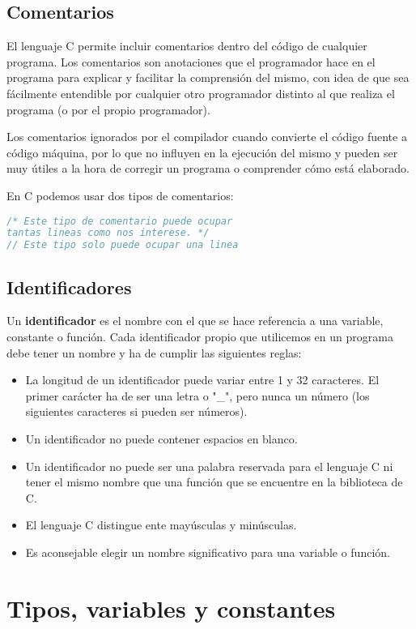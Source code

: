 \subsection{Comentarios}{
El lenguaje C permite incluir comentarios dentro del código de cualquier programa. Los comentarios son anotaciones que el programador hace en el programa para explicar y facilitar la comprensión del mismo, con idea de que sea fácilmente entendible por cualquier otro programador distinto al que realiza el programa (o por el propio programador).

Los comentarios ignorados por el compilador cuando convierte el código fuente a código máquina, por lo que no influyen en la ejecución del mismo y pueden ser muy útiles a la hora de corregir un programa o comprender cómo está elaborado.

En C podemos usar dos tipos de comentarios:
\begin{lstlisting}[language=C]
/* Este tipo de comentario puede ocupar
tantas lineas como nos interese. */
// Este tipo solo puede ocupar una linea
\end{lstlisting}
}
\subsection{Identificadores}{
Un \textbf{identificador} es el nombre con el que se hace referencia a una variable, constante o función. Cada identificador propio que utilicemos en un programa debe tener un nombre y ha de cumplir las siguientes reglas:
\begin{itemize}
	\item La longitud de un identificador puede variar entre 1 y 32 caracteres. El primer carácter ha de ser una letra o "\_", pero nunca un número (los siguientes caracteres si pueden ser números).
	\item Un identificador no puede contener espacios en blanco.
	\item Un identificador no puede ser una palabra reservada para el lenguaje C ni tener el mismo nombre que una función que se encuentre en la biblioteca de C.
	\item El lenguaje C distingue ente mayúsculas y minúsculas.
	\item Es aconsejable elegir un nombre significativo para una variable o función.
\end{itemize}
}
\section{Tipos, variables y constantes}
